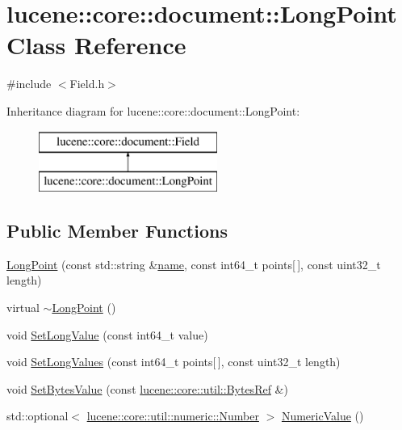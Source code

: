 \hypertarget{classlucene_1_1core_1_1document_1_1LongPoint}{}\section{lucene\+:\+:core\+:\+:document\+:\+:Long\+Point Class Reference}
\label{classlucene_1_1core_1_1document_1_1LongPoint}


{\ttfamily \#include $<$Field.\+h$>$}

Inheritance diagram for lucene\+:\+:core\+:\+:document\+:\+:Long\+Point\+:\begin{figure}[H]
\begin{center}
\leavevmode
\includegraphics[height=2.000000cm]{classlucene_1_1core_1_1document_1_1LongPoint}
\end{center}
\end{figure}
\subsection*{Public Member Functions}
\begin{DoxyCompactItemize}
\item 
\mbox{\hyperlink{classlucene_1_1core_1_1document_1_1LongPoint_afafac70472560f4063bc11afe18be5c7}{Long\+Point}} (const std\+::string \&\mbox{\hyperlink{classlucene_1_1core_1_1document_1_1Field_a52f673f3b3abb14b180f5159f4726537}{name}}, const int64\+\_\+t points\mbox{[}$\,$\mbox{]}, const uint32\+\_\+t length)
\item 
virtual \mbox{\hyperlink{classlucene_1_1core_1_1document_1_1LongPoint_ab2c1cbcab4d27060d84d7439b80b2dd7}{$\sim$\+Long\+Point}} ()
\item 
void \mbox{\hyperlink{classlucene_1_1core_1_1document_1_1LongPoint_a5bc668dfdf190b8bc0a52808a6580b40}{Set\+Long\+Value}} (const int64\+\_\+t value)
\item 
void \mbox{\hyperlink{classlucene_1_1core_1_1document_1_1LongPoint_a8561762cd09cae0222620709406e3ba2}{Set\+Long\+Values}} (const int64\+\_\+t points\mbox{[}$\,$\mbox{]}, const uint32\+\_\+t length)
\item 
void \mbox{\hyperlink{classlucene_1_1core_1_1document_1_1LongPoint_a3ba17f0b827e583a9b568e368dd798ac}{Set\+Bytes\+Value}} (const \mbox{\hyperlink{classlucene_1_1core_1_1util_1_1BytesRef}{lucene\+::core\+::util\+::\+Bytes\+Ref}} \&)
\item 
std\+::optional$<$ \mbox{\hyperlink{classlucene_1_1core_1_1util_1_1numeric_1_1Number}{lucene\+::core\+::util\+::numeric\+::\+Number}} $>$ \mbox{\hyperlink{classlucene_1_1core_1_1document_1_1LongPoint_a24068a492dbb14946de8de3bde3bd87b}{Numeric\+Value}} ()
\end{DoxyCompactItemize}
